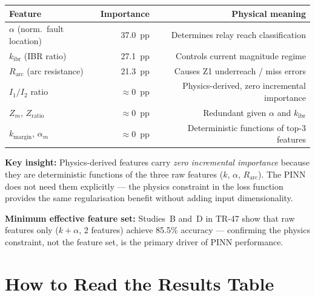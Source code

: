 \documentclass[12pt,a4paper]{article}
\newcommand{\kibr}{k_\mathrm{ibr}}
\begin{document}
\begin{center}
\begin{tabular}{@{}lrr@{}}
\toprule
\textbf{Feature} & \textbf{Importance} & \textbf{Physical meaning} \\
\midrule
$\alpha$ (norm.\ fault location)  & 37.0~pp & Determines relay reach classification \\
$\kibr$ (IBR ratio)               & 27.1~pp & Controls current magnitude regime \\
$R_\mathrm{arc}$ (arc resistance) & 21.3~pp & Causes Z1 underreach / miss errors \\
$I_1/I_2$ ratio                   & $\approx 0$~pp & Physics-derived, zero incremental importance \\
$Z_m$, $Z_\mathrm{ratio}$         & $\approx 0$~pp & Redundant given $\alpha$ and $\kibr$ \\
$k_\mathrm{margin}$, $\alpha_m$   & $\approx 0$~pp & Deterministic functions of top-3 features \\
\bottomrule
\end{tabular}
\end{center}

\textbf{Key insight:} Physics-derived features carry \textit{zero incremental importance} because they are deterministic functions of the three raw features ($k$, $\alpha$, $R_\mathrm{arc}$). The PINN does not need them explicitly — the physics constraint in the loss function provides the same regularisation benefit without adding input dimensionality.

\textbf{Minimum effective feature set:} Studies~B and~D in TR-47 show that raw features only ($k + \alpha$, 2 features) achieve 85.5\% accuracy — confirming the physics constraint, not the feature set, is the primary driver of PINN performance.

\section{How to Read the Results Table}
\end{document}
